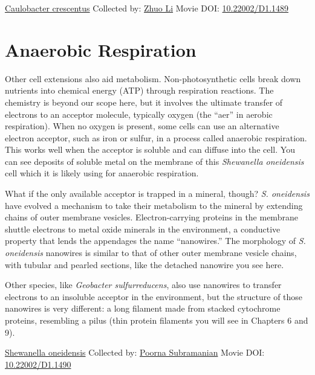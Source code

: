 \documentclass[]{tufte-book}
\begin{document}
\hypertarget{htmlwidget-d89200dfa630967ffd2c}{}

\label{fig:4-1}\protect\hyperlink{tree}{Caulobacter crescentus} Collected by: \protect\hyperlink{zhuo_li}{Zhuo Li} Movie DOI: \href{https://doi.org/10.22002/D1.1489}{10.22002/D1.1489}

\hypertarget{anaerobic-respiration}{%
\section{Anaerobic Respiration}\label{anaerobic-respiration}}

Other cell extensions also aid metabolism. Non-photosynthetic cells break down nutrients into chemical energy (ATP) through respiration reactions. The chemistry is beyond our scope here, but it involves the ultimate transfer of electrons to an acceptor molecule, typically oxygen (the ``aer'' in aerobic respiration). When no oxygen is present, some cells can use an alternative electron acceptor, such as iron or sulfur, in a process called anaerobic respiration. This works well when the acceptor is soluble and can diffuse into the cell. You can see deposits of soluble metal on the membrane of this \emph{Shewanella oneidensis} cell which it is likely using for anaerobic respiration.

What if the only available acceptor is trapped in a mineral, though? \emph{S. oneidensis} have evolved a mechanism to take their metabolism to the mineral by extending chains of outer membrane vesicles. Electron-carrying proteins in the membrane shuttle electrons to metal oxide minerals in the environment, a conductive property that lends the appendages the name ``nanowires.'' The morphology of \emph{S. oneidensis} nanowires is similar to that of other outer membrane vesicle chains, with tubular and pearled sections, like the detached nanowire you see here.

Other species, like \emph{Geobacter sulfurreducens}, also use nanowires to transfer electrons to an insoluble acceptor in the environment, but the structure of those nanowires is very different: a long filament made from stacked cytochrome proteins, resembling a pilus (thin protein filaments you will see in Chapters 6 and 9).



\hypertarget{htmlwidget-7d859f4abc922c0b5301}{}

\label{fig:4-2}\protect\hyperlink{tree}{Shewanella oneidensis} Collected by: \protect\hyperlink{poorna_subramanian}{Poorna Subramanian} Movie DOI: \href{https://doi.org/10.22002/D1.1490}{10.22002/D1.1490}
\end{document}
